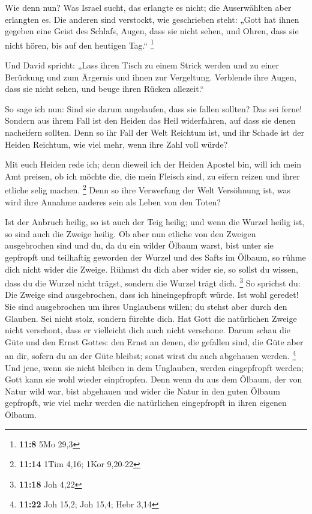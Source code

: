 Wie denn nun? Was Israel sucht, das erlangte es nicht;
die Auserwählten aber erlangten es. Die anderen sind verstockt,
 wie geschrieben steht: „Gott hat ihnen gegeben eine Geist
des Schlafs, Augen, dass sie nicht sehen, und Ohren, dass sie nicht
hören, bis auf den heutigen Tag.`` \footnote{\textbf{11:8} 5Mo 29,3}

 Und David spricht: „Lass ihren Tisch zu einem Strick
werden und zu einer Berückung und zum Ärgernis und ihnen zur Vergeltung.
 Verblende ihre Augen, dass sie nicht sehen, und beuge
ihren Rücken allezeit.``

 So sage ich nun: Sind sie darum angelaufen, dass sie
fallen sollten? Das sei ferne! Sondern aus ihrem Fall ist den Heiden das
Heil widerfahren, auf dass sie denen nacheifern sollten. 
Denn so ihr Fall der Welt Reichtum ist, und ihr Schade ist der Heiden
Reichtum, wie viel mehr, wenn ihre Zahl voll würde?

 Mit euch Heiden rede ich; denn dieweil ich der Heiden
Apostel bin, will ich mein Amt preisen,  ob ich möchte
die, die mein Fleisch sind, zu eifern reizen und ihrer etliche selig
machen. \footnote{\textbf{11:14} 1Tim 4,16; 1Kor 9,20-22}
 Denn so ihre Verwerfung der Welt Versöhnung ist, was
wird ihre Annahme anderes sein als Leben von den Toten?

 Ist der Anbruch heilig, so ist auch der Teig heilig; und
wenn die Wurzel heilig ist, so sind auch die Zweige heilig.
 Ob aber nun etliche von den Zweigen ausgebrochen sind
und du, da du ein wilder Ölbaum warst, bist unter sie gepfropft und
teilhaftig geworden der Wurzel und des Safts im Ölbaum, 
so rühme dich nicht wider die Zweige. Rühmst du dich aber wider sie, so
sollst du wissen, dass du die Wurzel nicht trägst, sondern die Wurzel
trägt dich. \footnote{\textbf{11:18} Joh 4,22}  So
sprichst du: Die Zweige sind ausgebrochen, dass ich hineingepfropft
würde.  Ist wohl geredet! Sie sind ausgebrochen um ihres
Unglaubens willen; du stehst aber durch den Glauben. Sei nicht stolz,
sondern fürchte dich.  Hat Gott die natürlichen Zweige
nicht verschont, dass er vielleicht dich auch nicht verschone.
 Darum schau die Güte und den Ernst Gottes: den Ernst an
denen, die gefallen sind, die Güte aber an dir, sofern du an der Güte
bleibst; sonst wirst du auch abgehauen werden. \footnote{\textbf{11:22}
  Joh 15,2; Joh 15,4; Hebr 3,14}  Und jene, wenn sie
nicht bleiben in dem Unglauben, werden eingepfropft werden; Gott kann
sie wohl wieder einpfropfen.  Denn wenn du aus dem
Ölbaum, der von Natur wild war, bist abgehauen und wider die Natur in
den guten Ölbaum gepfropft, wie viel mehr werden die natürlichen
eingepfropft in ihren eigenen Ölbaum.

